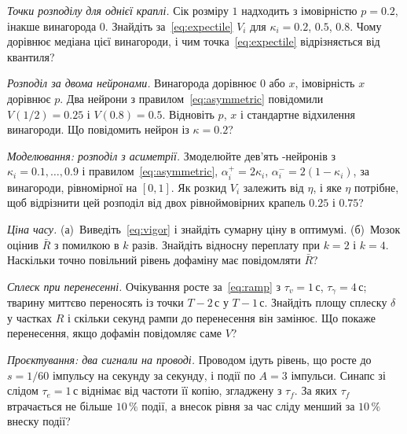 \begin{exercise}[\lvlA]
\label{ex:07:1}
\emph{Точки розподілу для однієї краплі.} Сік розміру $1$ надходить з імовірністю $p=0.2$, інакше винагорода $0$. Знайдіть за~\eqref{eq:expectile} $V_i$ для $\kappa_i=0.2$, $0.5$, $0.8$. Чому дорівнює медіана цієї винагороди, і чим точка~\eqref{eq:expectile} відрізняється від квантиля?
\end{exercise}

\begin{exercise}[\lvlB]
\label{ex:07:2}
\emph{Розподіл за двома нейронами.} Винагорода дорівнює $0$ або $x$, імовірність $x$ дорівнює $p$. Два нейрони з правилом~\eqref{eq:asymmetric} повідомили $V(1/2)=0.25$ і $V(0.8)=0.5$. Відновіть $p$, $x$ і стандартне відхилення винагороди. Що повідомить нейрон із $\kappa=0.2$?
\end{exercise}

\begin{exercise}[\lvlB]
\label{ex:07:3}
\emph{Моделювання: розподіл з асиметрії.} Змоделюйте дев'ять -нейронів з $\kappa_i=0.1,\dots,0.9$ і правилом~\eqref{eq:asymmetric}, $\alpha_i^+=2\kappa_i$, $\alpha_i^-=2(1-\kappa_i)$, за винагороди, рівномірної на $[0,1]$. Як розкид $V_i$ залежить від $\eta$, і яке $\eta$ потрібне, щоб відрізнити цей розподіл від двох рівноймовірних крапель $0.25$ і $0.75$?
\end{exercise}

\begin{exercise}[\lvlA]
\label{ex:07:4}
\emph{Ціна часу.} (а)~Виведіть~\eqref{eq:vigor} і знайдіть сумарну ціну в оптимумі. (б)~Мозок оцінив $\bar R$ з помилкою в $k$ разів. Знайдіть відносну переплату при $k=2$ і $k=4$. Наскільки точно повільний рівень дофаміну має повідомляти $\bar R$?
\end{exercise}

\begin{exercise}[\lvlB]
\label{ex:07:5}
\emph{Сплеск при перенесенні.} Очікування росте за~\eqref{eq:ramp} з $\tau_v=1\,\text{с}$, $\tau_\gamma=4\,\text{с}$; тварину миттєво переносять із точки $T-2\,\text{с}$ у $T-1\,\text{с}$. Знайдіть площу сплеску $\delta$ у частках $R$ і скільки секунд рампи до перенесення він замінює. Що покаже перенесення, якщо дофамін повідомляє саме $V$?
\end{exercise}

\begin{exercise}[\lvlB]
\label{ex:07:6}
\emph{Проєктування: два сигнали на проводі.} Проводом  ідуть рівень, що росте до $s=1/60$ імпульсу на секунду за секунду, і події по $A=3$ імпульси. Синапс зі слідом $\tau_e=1\,\text{с}$ віднімає від частоти її копію, згладжену з $\tau_f$. За яких $\tau_f$ втрачається не більше $10\,\%$ події, а внесок рівня за час сліду менший за $10\,\%$ внеску події?
\end{exercise}

